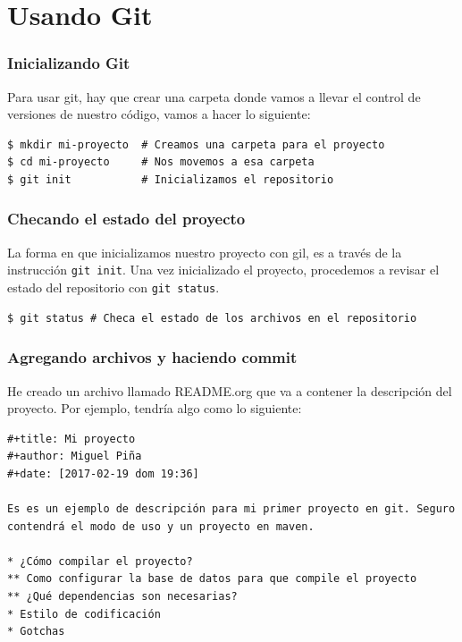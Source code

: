 \documentclass{beamer}
\begin{document}
\section{Usando Git}

\begin{frame}[fragile]
  \frametitle{Inicializando Git}
  Para usar git, hay que crear una carpeta donde vamos a llevar el
  control de versiones de nuestro código, vamos a hacer lo siguiente:  \\

  \begin{verbatim}
$ mkdir mi-proyecto  # Creamos una carpeta para el proyecto
$ cd mi-proyecto     # Nos movemos a esa carpeta
$ git init           # Inicializamos el repositorio
\end{verbatim}
\end{frame}

\begin{frame}[fragile]
  \frametitle{Checando el estado del proyecto}
  La forma en que inicializamos nuestro proyecto con gil, es a través
  de la instrucción \texttt{git init}. Una vez inicializado el proyecto,
  procedemos a revisar el estado del repositorio con \texttt{git status}.\\

  \begin{verbatim}
$ git status # Checa el estado de los archivos en el repositorio
  \end{verbatim}
\end{frame}

\begin{frame}[fragile]
  \frametitle{Agregando archivos y haciendo commit}
  He creado un archivo llamado README.org que va a contener la
  descripción del proyecto. Por ejemplo, tendría algo como lo
  siguiente:

  \begin{verbatim}
#+title: Mi proyecto
#+author: Miguel Piña
#+date: [2017-02-19 dom 19:36]

Es es un ejemplo de descripción para mi primer proyecto en git. Seguro
contendrá el modo de uso y un proyecto en maven.

* ¿Cómo compilar el proyecto?
** Como configurar la base de datos para que compile el proyecto
** ¿Qué dependencias son necesarias?
* Estilo de codificación
* Gotchas
  \end{verbatim}
\end{frame}
\end{document}
